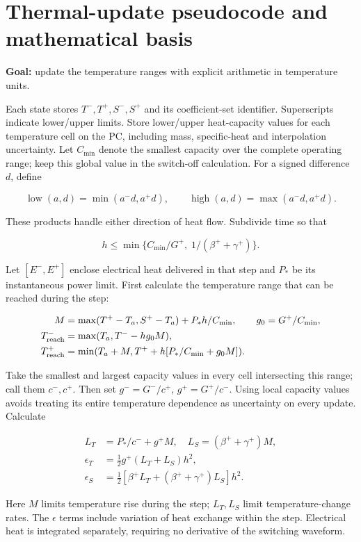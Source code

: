 \documentclass[11pt,letterpaper]{article}
\begin{document}
\section{Thermal-update pseudocode and mathematical basis}

\textbf{Goal:} update the temperature ranges with explicit arithmetic in temperature units.

Each state stores \(T^-,T^+,S^-,S^+\) and its coefficient-set identifier. Superscripts indicate lower/upper limits. Store lower/upper heat-capacity values for each temperature cell on the PC, including mass, specific-heat and interpolation uncertainty. Let \(C_{\min}\) denote the smallest capacity over the complete operating range; keep this global value in the switch-off calculation. For a signed difference \(d\), define

\[
\operatorname{low}(a,d)=\min(a^-d,a^+d),\qquad
\operatorname{high}(a,d)=\max(a^-d,a^+d).
\]

These products handle either direction of heat flow. Subdivide time so that

\[
h\le\min\{C_{\min}/G^+,\;1/(\beta^++\gamma^+)\}.
\]

Let \([E^-,E^+]\) enclose electrical heat delivered in that step and \(P_*\) be its instantaneous power limit. First calculate the temperature range that can be reached during the step:

\[
\begin{aligned}
M&=\max(T^+-T_a,S^+-T_a)+P_*h/C_{\min},\qquad g_0=G^+/C_{\min},\\
T_{\rm reach}^-&=\max(T_a,T^- -hg_0M),\\
T_{\rm reach}^+&=\min(T_a+M,T^+ +h[P_*/C_{\min}+g_0M]).
\end{aligned}
\]

Take the smallest and largest capacity values in every cell intersecting this range; call them \(c^-,c^+\). Then set \(g^-=G^-/c^+\), \(g^+=G^+/c^-\). Using local capacity values avoids treating its entire temperature dependence as uncertainty on every update. Calculate

\[
\begin{aligned}
L_T&=P_*/c^-+g^+M,\quad L_S=(\beta^++\gamma^+)M,\\
\epsilon_T&=\tfrac12 g^+(L_T+L_S)h^2,\\
\epsilon_S&=\tfrac12[\beta^+L_T+(\beta^++\gamma^+)L_S]h^2.
\end{aligned}
\]

Here \(M\) limits temperature rise during the step; \(L_T,L_S\) limit temperature-change rates. The \(\epsilon\) terms include variation of heat exchange within the step. Electrical heat is integrated separately, requiring no derivative of the switching waveform.
\end{document}
